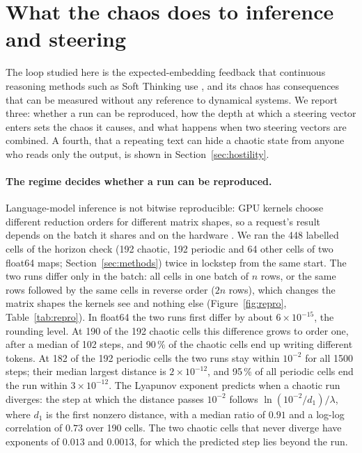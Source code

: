 \section{What the chaos does to inference and steering}
\label{sec:consequences}
The loop studied here is the expected-embedding feedback that continuous reasoning methods such as Soft Thinking use
\cite{zhang2025softthinking}, and its chaos has consequences that can be measured without any reference to dynamical
systems. We report three: whether a run can be reproduced, how the depth at which a steering vector enters sets the
chaos it causes, and what happens when two steering vectors are combined. A fourth, that a repeating text can hide a
chaotic state from anyone who reads only the output, is shown in Section~\ref{sec:hostility}.

\paragraph{The regime decides whether a run can be reproduced.} Language-model inference is not bitwise
reproducible: GPU kernels choose different reduction orders for different matrix shapes, so a request's result depends
on the batch it shares and on the hardware \cite{he2025nondeterminism,yuan2025nondeterminism}. We ran the 448 labelled
cells of the horizon check (192 chaotic, 192 periodic and 64 other cells of two float64 maps; Section~\ref{sec:methods})
twice in lockstep from the same start. The two runs differ only in the batch: all cells in one batch of $n$ rows, or
the same rows followed by the same cells in reverse order ($2n$ rows), which changes the matrix shapes the kernels see
and nothing else (Figure~\ref{fig:repro},
Table~\ref{tab:repro}). In float64 the two runs first differ by about $6\times10^{-15}$, the rounding level. At 190 of
the 192 chaotic cells this difference grows to order one, after a median of 102 steps, and 90\,\% of the chaotic cells
end up writing different tokens. At 182 of the 192 periodic cells the two runs stay within $10^{-2}$ for all 1500
steps; their median largest distance is $2\times10^{-12}$, and 95\,\% of all periodic cells end the run within
$3\times10^{-12}$. The Lyapunov exponent predicts when a chaotic run
diverges: the step at which the distance passes $10^{-2}$ follows $\ln(10^{-2}/d_1)/\lambda$, where $d_1$ is the first
nonzero distance, with a median ratio of $0.91$ and a log-log correlation of $0.73$ over 190 cells. The two chaotic
cells that never diverge have exponents of $0.013$ and $0.0013$, for which the predicted step lies beyond the run.

